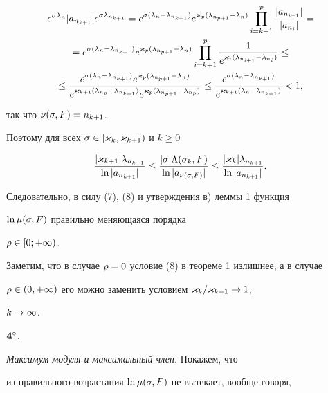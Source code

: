 \begin{pf}
\begin{multline*}
{e^{\s\la_n}}{|a_{n_{k+1}}|e^{\s\la_{n_{k+1}}}}=


e^{\s(\la_n-\la_{n_{k+1}})}e^{\k_p(\la_{n_{p+1}}-\la_n)}


\prod_{i=k+1}^{p}\frac{|a_{n_{i+1}}|}{|a_{n_{i}}|}=\\


=e^{\s(\la_n-\la_{n_{k+1}})}e^{\k_p(\la_{n_{p+1}}-\la_n)}


\prod_{i=k+1}^{p}\frac1{e^{\k_i(\la_{n_{i+1}}-\la_{n_i})}}\le\\


\le\frac{e^{\s(\la_n-\la_{n_{k+1}})}e^{\k_p(\la_{n_{p+1}}-\la_n)}}


{e^{\k_{k+1}(\la_{n_p}-\la_{n_{k+1}})}e^{\k_p(\la_{n_{p+1}}-\la_{n_p})}}\le


\frac{e^{\s(\la_n-\la_{n_{k+1}})}}


{e^{\k_{k+1}(\la_n-\la_{n_{k+1}})}}<1,


\end{multline*}


так что $\nu(\sigma,F)=n_{k+1}$.


Поэтому для всех $\sigma\in[\varkappa_k,\varkappa_{k+1})$ и $k\ge 0$


$$


\frac{|\k_{k+1}|\la_{n_{k+1}}}{\ln|a_{n_{k+1}}|}\le


\frac{|\s|\L(\s_k,F)}{\ln|a_{\nu(\s,F)}|}\le


\frac{|\k_k|\la_{n_{k+1}}}{\ln|a_{n_{k+1}}|}.


$$


Следовательно, в силу (7), (8) и утверждения в) леммы 1 функция


$\ln\mu(\sigma,F)$ правильно меняющаяся порядка


$\rho\in[0;+\infty)$.


\end{pf}





Заметим, что в случае $\rho=0$ условие (8) в теореме 1 излишнее, а в случае 


$\rho\in(0,+\infty)$ его можно заменить условием $\varkappa_k/\varkappa_{k+1}\to 1$,


$k\to\infty$.


\medskip





$\bold 4^\circ$.


{\it Максимум модуля и максимальный член.} Покажем, что


из правильного возрастания $\ln \mu(\sigma,F)$ не вытекает, вообще говоря,


